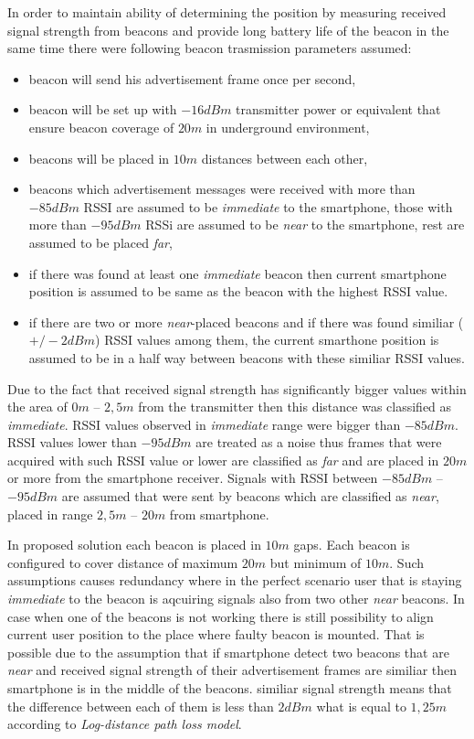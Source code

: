 \documentclass[../main.tex]{subfiles}
\begin{document}
In order to maintain ability of determining the position by measuring received signal strength from beacons and provide long battery life of the beacon in the same time there were following beacon trasmission parameters assumed:
\begin{itemize}
	\item beacon will send his advertisement frame once per second,
	\item beacon will be set up with $-16 dBm$ transmitter power or equivalent that ensure beacon coverage of $20 m$ in underground environment,
	\item beacons will be placed in $10 m$ distances between each other,
	\item beacons which advertisement messages were received with more than $-85 dBm$ RSSI are assumed to be \textit{immediate} to the smartphone, those with more than $-95 dBm$ RSSi are assumed to be \textit{near} to the smartphone, rest are assumed to be placed \textit{far},
	\item if there was found at least one \textit{immediate} beacon then current smartphone position is assumed to be same as the beacon with the highest RSSI value.
	\item if there are two or more \textit{near}-placed beacons and if there was found similiar ($+/- 2 dBm$) RSSI values among them, the current smarthone position is assumed to be in a half way between beacons with these similiar RSSI values.
\end{itemize}

Due to the fact that received signal strength has significantly bigger values within the area of $0 m$ -- $2,5 m$ from the transmitter then this distance was classified as \textit{immediate}. RSSI values observed in \textit{immediate} range were bigger than $-85 dBm$. RSSI values lower than $-95 dBm$ are treated as a noise thus frames that were acquired with such RSSI value or lower are classified as \textit{far} and are placed in $20 m$ or more from the smartphone receiver. Signals with RSSI between $-85 dBm$ -- $-95 dBm$ are assumed that were sent by beacons which are classified as \textit{near}, placed in range $2,5 m$ -- $20 m$ from smartphone.

In proposed solution each beacon is placed in $10 m$ gaps. Each beacon is configured to cover distance of maximum $20 m$ but minimum of $10 m$. Such assumptions causes redundancy where in the perfect scenario user that is staying \textit{immediate} to the beacon is aqcuiring signals also from two other \textit{near} beacons. In case when one of the beacons is not working there is still possibility to align current user position to the place where faulty beacon is mounted. That is possible due to the assumption that if smartphone detect two beacons that are \textit{near} and received signal strength of their advertisement frames are similiar then smartphone is in the middle of the beacons. similiar signal strength means that the difference between each of them is less than $2 dBm$ what is equal to $1,25 m$ according to \textit{Log-distance path loss model}.
\end{document}
